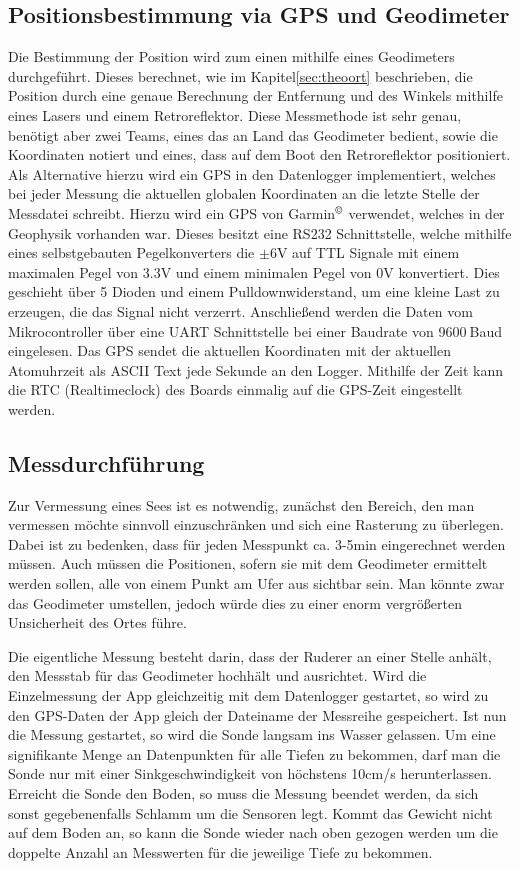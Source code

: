 \documentclass[12pt,a4paper,titlepage,headinclude,bibtotoc]{scrartcl}
\numberwithin{equation}{subsection}
\begin{document}
\subsection{Positionsbestimmung via GPS und Geodimeter}
\label{sec:durchpos}
Die Bestimmung der Position wird zum einen mithilfe eines Geodimeters durchgeführt.
Dieses berechnet, wie im Kapitel\ref{sec:theoort} beschrieben, die Position durch eine genaue Berechnung der Entfernung und des Winkels mithilfe eines Lasers und einem Retroreflektor.
Diese Messmethode ist sehr genau, benötigt aber zwei Teams, eines das an Land das Geodimeter bedient, sowie die Koordinaten notiert und eines, dass auf dem Boot den Retroreflektor positioniert.\\
Als Alternative hierzu wird ein GPS in den Datenlogger implementiert, welches bei jeder Messung die aktuellen globalen Koordinaten an die letzte Stelle der Messdatei schreibt.
Hierzu wird ein GPS von Garmin$^{\copyright}$ verwendet, welches in der Geophysik vorhanden war.
Dieses besitzt eine RS232 Schnittstelle, welche mithilfe eines selbstgebauten Pegelkonverters die $\pm6\si{\volt}$ auf TTL Signale mit einem maximalen Pegel von 3.3\si{\volt} und einem minimalen Pegel von 0\si{\volt} konvertiert.
Dies geschieht über 5 Dioden und einem Pulldownwiderstand, um eine kleine Last zu erzeugen, die das Signal nicht verzerrt.
Anschließend werden die Daten vom Mikrocontroller über eine UART Schnittstelle bei einer Baudrate von 9600$~$Baud eingelesen.
Das GPS sendet die aktuellen Koordinaten mit der aktuellen Atomuhrzeit als ASCII Text jede Sekunde an den Logger.
Mithilfe der Zeit kann die RTC (Realtimeclock) des Boards einmalig auf die GPS-Zeit eingestellt werden.

\subsection{Messdurchführung}

Zur Vermessung eines Sees ist es notwendig, zunächst den Bereich, den man vermessen möchte sinnvoll einzuschränken und sich eine Rasterung zu überlegen.
Dabei ist zu bedenken, dass für jeden Messpunkt ca. 3-5min eingerechnet werden müssen.
Auch müssen die Positionen, sofern sie mit dem Geodimeter ermittelt werden sollen, alle von einem Punkt am Ufer aus sichtbar sein.
Man könnte zwar das Geodimeter umstellen, jedoch würde dies zu einer enorm vergrößerten Unsicherheit des Ortes führe.

Die eigentliche Messung besteht darin, dass der Ruderer an einer Stelle anhält, den Messstab für das Geodimeter hochhält und ausrichtet.
Wird die Einzelmessung der App gleichzeitig mit dem Datenlogger gestartet, so wird zu den GPS-Daten der App gleich der Dateiname der Messreihe gespeichert.
Ist nun die Messung gestartet, so wird die Sonde langsam ins Wasser gelassen.
Um eine signifikante Menge an Datenpunkten für alle Tiefen zu bekommen, darf man die Sonde nur mit einer Sinkgeschwindigkeit von höchstens 10cm/s herunterlassen.
Erreicht die Sonde den Boden, so muss die Messung beendet werden, da sich sonst gegebenenfalls Schlamm um die Sensoren legt.
Kommt das Gewicht nicht auf dem Boden an, so kann die Sonde wieder nach oben gezogen werden um die doppelte Anzahl an Messwerten für die jeweilige Tiefe zu bekommen.
\end{document}
